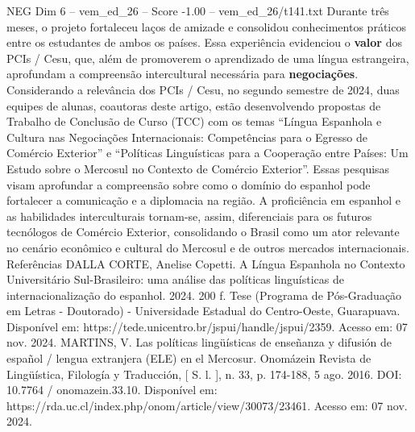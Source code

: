 \begin{textsample}{NEG Dim 6 – vem\_ed\_26 – Score -1.00 – vem\_ed\_26/t141.txt}
Durante três meses, o projeto fortaleceu laços de amizade e consolidou conhecimentos práticos entre os estudantes de ambos os países.
Essa experiência evidenciou o \textbf{valor} dos PCIs / Cesu, que, além de promoverem o aprendizado de uma língua estrangeira, aprofundam a compreensão intercultural necessária para \textbf{negociações}.
Considerando a relevância dos PCIs / Cesu, no segundo semestre de 2024, duas equipes de alunas, coautoras deste artigo, estão desenvolvendo propostas de Trabalho de Conclusão de Curso (TCC) com os temas “Língua Espanhola e Cultura nas Negociações Internacionais: Competências para o Egresso de Comércio Exterior” e “Políticas Linguísticas para a Cooperação entre Países: Um Estudo sobre o Mercosul no Contexto de Comércio Exterior”.
Essas pesquisas visam aprofundar a compreensão sobre como o domínio do espanhol pode fortalecer a comunicação e a diplomacia na região.
A proficiência em espanhol e as habilidades interculturais tornam-se, assim, diferenciais para os futuros tecnólogos de Comércio Exterior, consolidando o Brasil como um ator relevante no cenário econômico e cultural do Mercosul e de outros mercados internacionais.
Referências DALLA CORTE, Anelise Copetti.
A Língua Espanhola no Contexto Universitário Sul-Brasileiro: uma análise das políticas linguísticas de internacionalização do espanhol. 2024. 200 f.
Tese (Programa de Pós-Graduação em Letras - Doutorado) - Universidade Estadual do Centro-Oeste, Guarapuava.
Disponível em: https://tede.unicentro.br/jspui/handle/jspui/2359.
Acesso em: 07 nov. 2024.
MARTINS, V.
Las políticas lingüísticas de enseñanza y difusión de español / lengua extranjera (ELE) en el Mercosur.
Onomázein Revista de Lingüística, Filología y Traducción, [ S. l. ], n. 33, p. 174-188, 5 ago. 2016.
DOI: 10.7764 / onomazein.33.10.
Disponível em: https://rda.uc.cl/index.php/onom/article/view/30073/23461.
Acesso em: 07 nov. 2024.

\end{textsample}
